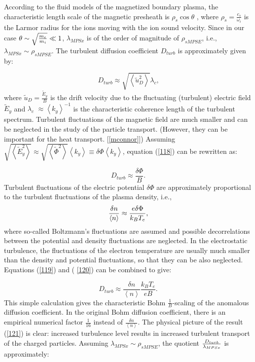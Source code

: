 \documentclass[11pt]{article}
\begin{document}
\bigskip

According to the fluid models of the magnetized boundary plasma, the
characteristic length scale of the magnetic presheath is $\rho_{s}\cos\theta$%
, where $\rho_{s}=\frac{c_{s}}{\omega_{i}}$ is the Larmor radius for the
ions moving with the ion sound velocity. Since in our case $\theta\sim\sqrt {%
\frac{m_{e}}{m_{i}}}\ll1$, $\lambda_{MPSx}$ is of the order of magnitude of $%
\rho_{sMPSE}$, i.e., $\lambda_{MPSx}\sim\rho_{sMPSE}$. The turbulent
diffusion coefficient $D_{turb}$ is approximately given by:

\begin{equation}
D_{turb}\approx\sqrt{\left\langle \widetilde{u}_{D}^{2}\right\rangle }%
\lambda_{c}\text{,}   \label{118}
\end{equation}
where $\widetilde{u}_{D}=\frac{\widetilde{E}_{y}}{B}$ is the drift velocity
due to the fluctuating (turbulent) electric field $\widetilde{E}_{y}$ and $%
\lambda_{c}$ $\approx\left\langle k_{y}\right\rangle ^{-1}$ is the
characteristic coherence length of the turbulent spectrum. Turbulent
fluctuations of the magnetic field are much smaller and can be neglected in
the study of the particle transport. (However, they can be important for the
heat transport. [\ref{mconnor}]) Assuming $\sqrt{\left\langle \widetilde
{E}_{y}^{2}\right\rangle }\approx\sqrt{\left\langle \widetilde{\Phi}%
^{2}\right\rangle }\left\langle k_{y}\right\rangle \equiv\delta\Phi
\left\langle k_{y}\right\rangle $, equation (\ref{118}) can be rewritten as:

\begin{equation}
D_{turb}\approx\frac{\delta\Phi}{B}\text{.}   \label{119}
\end{equation}
Turbulent fluctuations of the electric potential $\delta\Phi$ are
approximately proportional to the turbulent fluctuations of the plasma
density, i.e.,
\begin{equation}
\frac{\delta n}{\left\langle n\right\rangle }\approx\frac{e\delta\Phi}{%
k_{B}T_{e}}\text{,}   \label{120}
\end{equation}
where so-called Boltzmann's fluctuations are assumed and possible
decorrelations between the potential and density fluctuations are neglected.
In the electrostatic turbulence, the fluctuations of the electron
temperature are usually much smaller than the density and potential
fluctuations, so that they can be also neglected. Equations (\ref{119}) and (%
\ref{120}) can be combined to give:

\begin{equation}
D_{turb}\approx\frac{\delta n}{\left\langle n\right\rangle }\frac{k_{B}T_{e}%
}{eB}\text{.}   \label{121}
\end{equation}
This simple calculation gives the characteristic Bohm $\frac{1}{B}$-scaling
of the anomalous diffusion coefficient. In the original Bohm diffusion
coefficient, there is an empirical numerical factor $\frac{1}{16}$ instead
of $\frac{\delta n}{\left\langle n\right\rangle }$. The physical picture of
the result (\ref{121}) is clear: increased turbulence level results in
increased turbulent transport of the charged particles. Assuming $%
\lambda_{MPSx}\sim \rho_{sMPSE}$, the quotient $\frac{D_{turb}}{%
\lambda_{MPSx}}$ is approximately:
\end{document}
